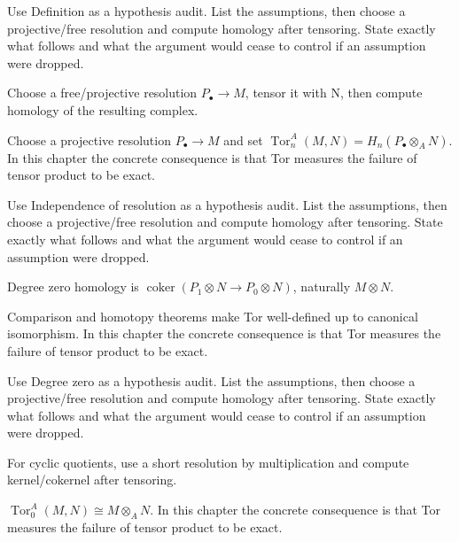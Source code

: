 \begin{exercise}\label{exr:v26-01}
Use Definition as a hypothesis audit. List the assumptions, then choose a projective/free resolution and compute homology after tensoring. State exactly what follows and what the argument would cease to control if an assumption were dropped.
\end{exercise}
\begin{hint}
Choose a free/projective resolution \(P_\bullet\to M\), tensor it with N, then compute homology of the resulting complex.
\end{hint}
\begin{solution}
Choose a projective resolution $P_\bullet\to M$ and set $\operatorname{Tor}_n^A(M,N)=H_n(P_\bullet\otimes_A N)$. In this chapter the concrete consequence is that Tor measures the failure of tensor product to be exact.
\end{solution}

\begin{exercise}\label{exr:v26-02}
Use Independence of resolution as a hypothesis audit. List the assumptions, then choose a projective/free resolution and compute homology after tensoring. State exactly what follows and what the argument would cease to control if an assumption were dropped.
\end{exercise}
\begin{hint}
Degree zero homology is \(\operatorname{coker}(P_1\otimes N\to P_0\otimes N)\), naturally \(M\otimes N\).
\end{hint}
\begin{solution}
Comparison and homotopy theorems make Tor well-defined up to canonical isomorphism. In this chapter the concrete consequence is that Tor measures the failure of tensor product to be exact.
\end{solution}

\begin{exercise}\label{exr:v26-03}
Use Degree zero as a hypothesis audit. List the assumptions, then choose a projective/free resolution and compute homology after tensoring. State exactly what follows and what the argument would cease to control if an assumption were dropped.
\end{exercise}
\begin{hint}
For cyclic quotients, use a short resolution by multiplication and compute kernel/cokernel after tensoring.
\end{hint}
\begin{solution}
$\operatorname{Tor}_0^A(M,N)\cong M\otimes_A N$. In this chapter the concrete consequence is that Tor measures the failure of tensor product to be exact.
\end{solution}

